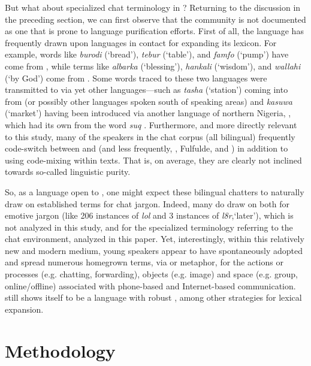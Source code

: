 \documentclass[output=paper
,newtxmath
,modfonts
,nonflat]{langsci/langscibook}
\begin{document}
But what about specialized chat terminology in ? Returning to the discussion in the preceding section, we can first observe that the  community is not documented as one that is prone to language purification efforts. First of all, the  language has frequently drawn upon languages in contact for expanding its lexicon. For example, words like \textit{burodi} (‘bread’), \textit{tebur} (‘table’), and \textit{famfo} (‘pump’) have come from , while terms like \textit{albarka} (‘blessing’), \textit{hankali} (‘wisdom’), and \textit{wallahi} (‘by God’) come from . Some words traced to these two languages were transmitted to  via yet other languages—such as \textit{tasha} (‘station’) coming into  from  (or possibly other languages spoken south of  speaking areas) and \textit{kasuwa} (‘market’) having been introduced via another language of northern Nigeria, , which had its own  from the  word \textit{suq} \citep{newman2000comp}. Furthermore, and more directly relevant to this study, many of the  speakers in the  chat corpus (all bilingual) frequently code-switch between  and  (and less frequently, , Fulfulde, and ) in addition to using  code-mixing within  texts. That is, on average, they are clearly not inclined towards so-called linguistic purity.

So, as a language open to , one might expect these bilingual chatters to naturally draw on established  terms for chat jargon. Indeed, many do draw on  both for emotive jargon (like 206 instances of \textit{lol} and 3 instances of \textit{l8r},‘later’), which is not analyzed in this study, and for the specialized terminology referring to the chat environment, analyzed in this paper. Yet, interestingly, within this relatively new and modern medium, young  speakers appear to have spontaneously adopted and spread numerous homegrown terms, via  or metaphor, for the actions or processes (e.g. chatting, forwarding), objects (e.g. image) and space (e.g. group, online/offline) associated with phone-based and Internet-based communication.  still shows itself to be a language with robust , among other strategies for lexical expansion.

\section{Methodology}\label{sec:purvis:3}
\end{document}
